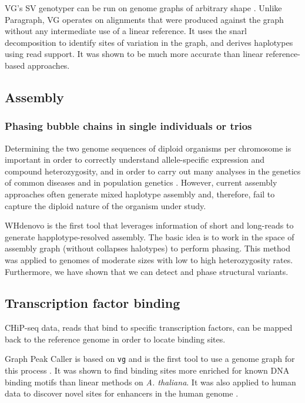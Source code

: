 VG's SV genotyper can be run on genome graphs of arbitrary shape \cite{hickey2019genotyping}.
Unlike Paragraph, VG operates on alignments that were produced against the graph without any intermediate use of a linear reference.
It uses the snarl decomposition \cite{paten2018superbubbles} to identify sites of variation in the graph, and derives haplotypes using read support.
It was shown to be much more accurate than linear reference-based approaches.

\subsection{Assembly}

\subsubsection{Phasing bubble chains in single individuals or trios}

Determining the two genome sequences of diploid organisms per chromosome is important in order to correctly understand allele-specific expression and compound heterozygosity, and in order to carry out many analyses in the genetics of common diseases and in population genetics \cite{tewhey2011importance}. 
However, current assembly approaches often generate mixed haplotype assembly and, therefore, fail to capture the diploid nature of the organism under study. 

WHdenovo \cite{garg2019trio, garg2018graph} is the first tool that leverages information of short and long-reads to generate happlotype-resolved assembly. 
The basic idea is to work in the space of assembly graph (without collapses halotypes) to perform phasing. 
This method was applied to genomes of moderate sizes with low to high heterozygosity rates. 
Furthermore, we have shown that we can detect and phase structural variants.

\subsection{Transcription factor binding}

CHiP-seq data, reads that bind to specific transcription factors, can be mapped back to the reference genome in order to locate binding sites.
 
Graph Peak Caller is based on \texttt{vg} and is the first tool to use a genome graph for this process \cite{Grytten_2019}.
It was shown to find binding sites more enriched for known DNA binding motifs than linear methods on \emph{A. thaliana}.
It was also applied to human data to discover novel sites for enhancers in the human genome \cite{groza2019personalized}. 

